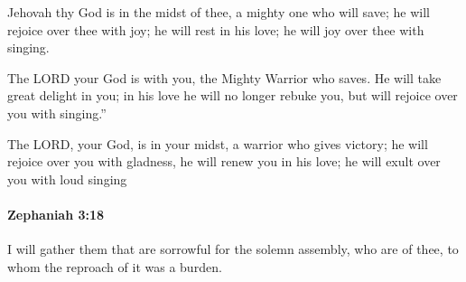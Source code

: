			\begin{versebox}
					\item[BHS] 
					\item[LXX] 
					\item[ASV] Jehovah thy God is in the midst of thee, a mighty one who will save; he will rejoice over thee with joy; he will rest in his love; he will joy over thee with singing.
					\item[NIV] The LORD your God is with you, the Mighty Warrior who saves. He will take great delight in you; in his love he will no longer rebuke you, but will rejoice over you with singing.”
					\item[NRSV] The LORD, your God, is in your midst, a warrior who gives victory; he will rejoice over you with gladness, he will renew you in his love; he will exult over you with loud singing
			\end{versebox}

		\paragraph{Zephaniah 3:18} %
			\label{ZEPHANIAH-3-18}

			I will gather them that are sorrowful for the solemn assembly, who are of thee, to whom the reproach of it was a burden.

